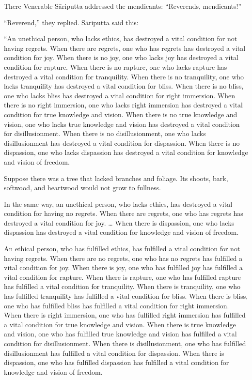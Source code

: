 \documentclass[12pt,openany]{book}%
\begin{document}
There Venerable \textsanskrit{Sāriputta} addressed the mendicants: “Reverends, mendicants!” 

“Reverend,” they replied. \textsanskrit{Sāriputta} said this: 

“An unethical person, who lacks ethics, has destroyed a vital condition for not having regrets. When there are regrets, one who has regrets has destroyed a vital condition for joy. When there is no joy, one who lacks joy has destroyed a vital condition for rapture. When there is no rapture, one who lacks rapture has destroyed a vital condition for tranquility. When there is no tranquility, one who lacks tranquility has destroyed a vital condition for bliss. When there is no bliss, one who lacks bliss has destroyed a vital condition for right immersion. When there is no right immersion, one who lacks right immersion has destroyed a vital condition for true knowledge and vision. When there is no true knowledge and vision, one who lacks true knowledge and vision has destroyed a vital condition for disillusionment. When there is no disillusionment, one who lacks disillusionment has destroyed a vital condition for dispassion. When there is no dispassion, one who lacks dispassion has destroyed a vital condition for knowledge and vision of freedom. 

Suppose there was a tree that lacked branches and foliage. Its shoots, bark, softwood, and heartwood would not grow to fullness. 

In the same way, an unethical person, who lacks ethics, has destroyed a vital condition for having no regrets. When there are regrets, one who has regrets has destroyed a vital condition for joy. … When there is dispassion, one who lacks dispassion has destroyed a vital condition for knowledge and vision of freedom. 

An ethical person, who has fulfilled ethics, has fulfilled a vital condition for not having regrets. When there are no regrets, one who has no regrets has fulfilled a vital condition for joy. When there is joy, one who has fulfilled joy has fulfilled a vital condition for rapture. When there is rapture, one who has fulfilled rapture has fulfilled a vital condition for tranquility. When there is tranquility, one who has fulfilled tranquility has fulfilled a vital condition for bliss. When there is bliss, one who has fulfilled bliss has fulfilled a vital condition for right immersion. When there is right immersion, one who has fulfilled right immersion has fulfilled a vital condition for true knowledge and vision. When there is true knowledge and vision, one who has fulfilled true knowledge and vision has fulfilled a vital condition for disillusionment. When there is disillusionment, one who has fulfilled disillusionment has fulfilled a vital condition for dispassion. When there is dispassion, one who has fulfilled dispassion has fulfilled a vital condition for knowledge and vision of freedom. 
\end{document}
